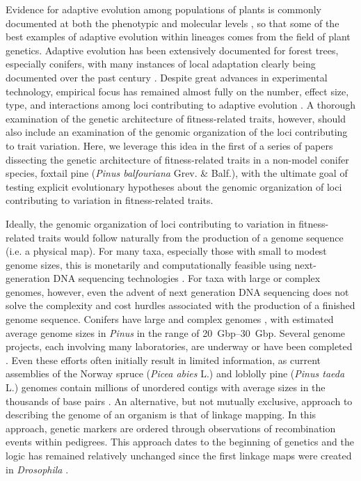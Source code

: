 \documentclass[11pt]{article}
\begin{document}
Evidence for adaptive evolution among populations of plants is commonly documented at both the phenotypic 
and molecular levels \citep{Kawecki:2004, Pannell:2013}, so that some of the best
examples of adaptive evolution within lineages comes from the field of plant genetics.
Adaptive evolution has been extensively documented for forest trees, especially conifers, with many instances of local adaptation clearly
being documented over the past century \citep{White:2007, Neale:2011}. Despite great advances in experimental technology, empirical 
focus has remained almost fully on the number, effect size, type, and interactions among loci contributing 
to adaptive evolution \citep{Neale:2011, Alberto:2013}.  A thorough examination of the 
genetic architecture of fitness-related traits, however, should also include 
an examination of the genomic organization of the loci contributing to trait variation. Here, we leverage 
this idea in the first of a series of papers dissecting the genetic architecture of fitness-related 
traits in a non-model conifer species, foxtail pine (\textit{Pinus balfouriana} Grev. \& Balf.), with the 
ultimate goal of testing explicit evolutionary hypotheses about the genomic organization of loci 
contributing to variation in fitness-related traits.

Ideally, the genomic organization of loci contributing to variation in fitness-related traits would follow 
naturally from the production of a genome sequence (i.e. a physical map). For many taxa, especially those with 
small to modest genome sizes, this is monetarily and computationally feasible using next-generation DNA sequencing 
technologies \citep{Koboldt:2013}. For taxa with large or complex genomes, however, even the advent of next generation DNA 
sequencing does not solve the complexity and cost hurdles associated with the production of a finished genome sequence. Conifers have large and 
complex genomes \citep{Murray:1998, Ahuja:2005}, with estimated average genome sizes in \textit{Pinus} in the 
range of \SIrange{20}{30}{Gbp}. Several genome projects, each involving many laboratories, are underway or have been 
completed \citep{Mackay:2012}. Even these efforts often initially result in limited information, 
as current assemblies of the Norway spruce (\textit{Picea abies} L.) and loblolly pine (\textit{Pinus taeda} L.) genomes 
contain millions of unordered contigs with average sizes in the thousands of base pairs \citep{Nystedt:2013}. An alternative, but 
not mutually exclusive, approach to describing the genome of an organism 
is that of linkage mapping. In this approach, genetic markers are ordered through observations of recombination events 
within pedigrees. This approach dates to the beginning of genetics and the logic has remained relatively unchanged 
since the first linkage maps were created in \textit{Drosophila} \citep{Sturtevant:1913}.
\end{document}
